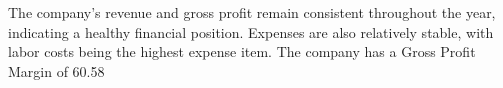 

The company's revenue and gross profit remain consistent throughout the year, indicating a healthy financial position. Expenses are also relatively stable, with labor costs being the highest expense item. The company has a Gross Profit Margin of 60.58%